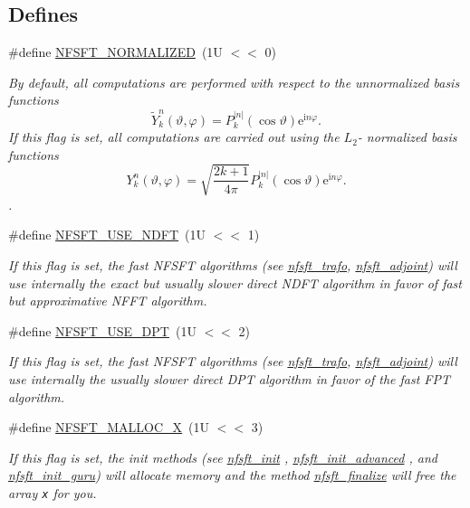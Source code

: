 \subsection*{Defines}
\begin{CompactItemize}
\item 
\#define \hyperlink{group__nfsft_g65036f479a7421863956c02aa78bc9be}{NFSFT\_\-NORMALIZED}~(1U $<$$<$ 0)
\begin{CompactList}\small\item\em By default, all computations are performed with respect to the unnormalized basis functions \[ \tilde{Y}_k^n(\vartheta,\varphi) = P_k^{|n|}(\cos\vartheta) \mathrm{e}^{\mathrm{i} n \varphi}. \] If this flag is set, all computations are carried out using the $L_2$- normalized basis functions \[ Y_k^n(\vartheta,\varphi) = \sqrt{\frac{2k+1}{4\pi}} P_k^{|n|}(\cos\vartheta) \mathrm{e}^{\mathrm{i} n \varphi}. \]. \item\end{CompactList}\item 
\#define \hyperlink{group__nfsft_gba029560a4a506c8f2dad185511db827}{NFSFT\_\-USE\_\-NDFT}~(1U $<$$<$ 1)
\begin{CompactList}\small\item\em If this flag is set, the fast NFSFT algorithms (see \hyperlink{group__nfsft_g5796fc68c432d46dfcab7abd8c56ee22}{nfsft\_\-trafo}, \hyperlink{group__nfsft_g813bb48d404c7286310733c99a81a169}{nfsft\_\-adjoint}) will use internally the exact but usually slower direct NDFT algorithm in favor of fast but approximative NFFT algorithm. \item\end{CompactList}\item 
\#define \hyperlink{group__nfsft_g6b9eed1e7bcf862dcc3111509075fcbb}{NFSFT\_\-USE\_\-DPT}~(1U $<$$<$ 2)
\begin{CompactList}\small\item\em If this flag is set, the fast NFSFT algorithms (see \hyperlink{group__nfsft_g5796fc68c432d46dfcab7abd8c56ee22}{nfsft\_\-trafo}, \hyperlink{group__nfsft_g813bb48d404c7286310733c99a81a169}{nfsft\_\-adjoint}) will use internally the usually slower direct DPT algorithm in favor of the fast FPT algorithm. \item\end{CompactList}\item 
\#define \hyperlink{group__nfsft_g02e4313d15b24c79e6802f853d452454}{NFSFT\_\-MALLOC\_\-X}~(1U $<$$<$ 3)
\begin{CompactList}\small\item\em If this flag is set, the init methods (see \hyperlink{group__nfsft_g65cda3f4a3edc5eb39c697cf34b1f0b9}{nfsft\_\-init} , \hyperlink{group__nfsft_ge7dca3e41afdb39e8c518af414878c18}{nfsft\_\-init\_\-advanced} , and \hyperlink{group__nfsft_g60466ed37643b6b7b7c1638056604d2b}{nfsft\_\-init\_\-guru}) will allocate memory and the method \hyperlink{group__nfsft_ga63e193a27d84059742ff25ff81e2ed1}{nfsft\_\-finalize} will free the array {\tt x} for you. \item\end{CompactList}\item 

\end{CompactItemize}
